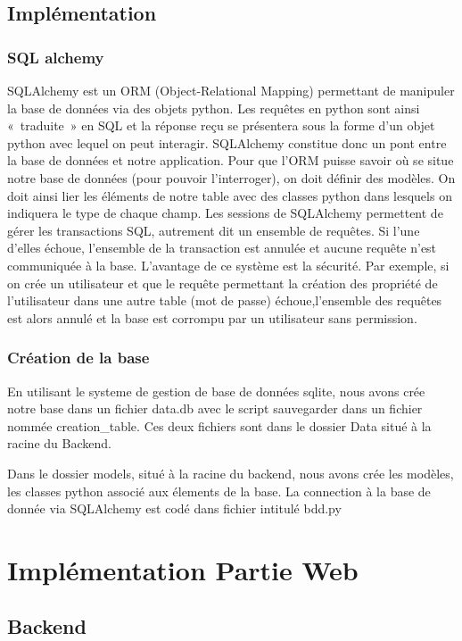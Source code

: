 \documentclass[french,a4paper]{article}
\begin{document}
\subsection{Implémentation}
\subsubsection{SQL alchemy}
SQLAlchemy est un ORM (Object-Relational Mapping) permettant de manipuler la base de données via des objets python. Les requêtes en 
python sont ainsi « traduite » en SQL et la réponse reçu se présentera sous la forme d’un objet python avec lequel on peut interagir. 
SQLAlchemy constitue donc un pont entre la base de données et notre application. Pour que l’ORM puisse savoir où se situe notre 
base de données (pour pouvoir l’interroger), on doit définir des modèles. 
On doit ainsi lier les éléments de notre table avec des classes python dans lesquels on indiquera le type de chaque champ. 
Les sessions de SQLAlchemy permettent de gérer les transactions SQL, autrement dit un ensemble de requêtes. Si l'une d'elles échoue,
l'ensemble de la transaction est annulée et aucune requête n'est communiquée à la base. L’avantage de ce système est la sécurité. 
Par exemple, si on crée un utilisateur et que le requête permettant la création des propriété de l’utilisateur dans une autre table 
(mot de passe) échoue,l’ensemble des requêtes est alors annulé et la base est corrompu par un utilisateur sans permission.

 \subsubsection{Création de la base}
 En utilisant le systeme de gestion de base de données sqlite, nous avons crée notre base dans un fichier data.db avec le script 
 sauvegarder dans un fichier nommée creation_table. Ces deux fichiers sont dans le dossier Data situé à la racine du Backend.  

 Dans le dossier models, situé à la racine du backend, nous avons crée les modèles, les classes python associé aux élements de la base. 
 La connection à la base de donnée via SQLAlchemy est codé dans fichier intitulé bdd.py

\newpage
\section{Implémentation Partie Web}
\subsection{Backend}
\end{document}
